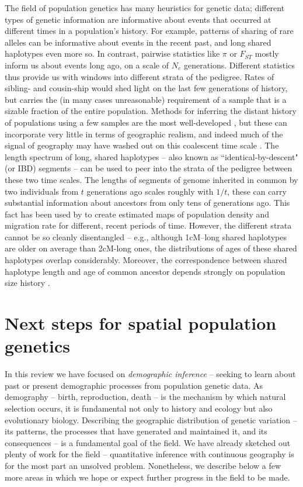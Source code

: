 \documentclass{ar-1col}
\renewcommand{\emph}[1]{{\textit{#1}}}
\begin{document}
The field of population genetics has many heuristics for genetic data; 
different types of genetic information are informative 
about events that occurred at different times in a population's history.
For example, patterns of sharing of rare alleles can be informative about events in the recent past,
and long shared haplotypes even more so.
In contrast, pairwise statistics like $\pi$ or $F_{ST}$ mostly inform us about events long ago,
on a scale of $N_e$ generations.
Different statistics thus provide us with windows into different strata of the pedigree.
Rates of sibling- and cousin-ship 
would shed light on the last few generations of history,
but carries the (in many cases unreasonable) requirement of a sample 
that is a sizable fraction of the entire population.
Methods for inferring the distant history of populations using a few samples
are the most well-developed \citep[e.g.,][]{dadi,Li_Durbin2011,momi},
but these can incorporate very little in terms of geographic realism,
and indeed much of the signal of geography 
may have washed out on this coalescent time scale \citep{wilkins2004separationoftimescales}.
The length spectrum of long, shared haplotypes --
also known as ``identical-by-descent" (or IBD) segments --
can be used to peer into the strata of the pedigree between these two time scales.
The lengths of segments of genome inherited in common by two individuals
from $t$ generations ago scales roughly with $1/t$, 
these can carry substantial information about ancestors from only tens of generations ago.
This fact has been used by \citet{alasadi2018estimating}
to create estimated maps of population density and migration rate
for different, recent periods of time.
However, the different strata cannot be so cleanly disentangled %
-- e.g., although 1cM--long shared haplotypes are older on average than 2cM-long ones,
the distributions of ages of these shared haplotypes overlap considerably.
Moreover, the correspondence between shared haplotype length and age of common ancestor
depends strongly on population size history \citep{ralph2013geography}.


\section{Next steps for spatial population genetics}

In this review we have focused on \emph{demographic inference} --
seeking to learn about past or present demographic processes
from population genetic data.
As demography -- birth, reproduction, death -- 
is the mechanism by which natural selection occurs,
it is fundamental not only to history and ecology but also evolutionary biology.
Describing the geographic distribution of genetic variation -- 
its patterns, 
the processes that have generated and maintained it, 
and its consequences -- 
is a fundamental goal of the field.
We have already sketched out plenty of work for the field
-- quantitative inference with continuous geography is for the most part an unsolved problem.
Nonetheless, we describe below a few more areas 
in which we hope or expect further progress in the field to be made.
\end{document}
